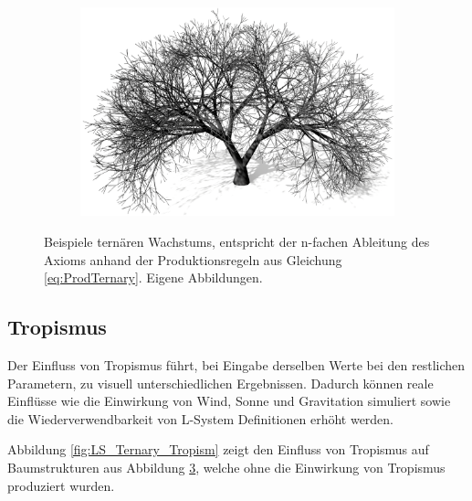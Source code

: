 \begin{figure} [hbtp]
\begin{subfigure}[t]{.45\textwidth}
		\caption{}
		\label{subfig:LS_Ternary_3}
	\end{subfigure}
	\begin{subfigure}[t]{.45\textwidth}
		\centering
		\includegraphics[width=\linewidth]{images/LS_Ternary_4.png}
		\caption{}
		\label{subfig:LS_Ternary_4}
	\end{subfigure}
	\caption{Beispiele ternären Wachstums, entspricht der n-fachen Ableitung des Axioms anhand der Produktionsregeln aus Gleichung \ref{eq:ProdTernary}. Eigene Abbildungen.}
	\label{fig:LS_Ternary}
\end{figure}


\subsection{Tropismus}

Der Einfluss von Tropismus führt, bei Eingabe derselben Werte bei den restlichen Parametern, zu visuell unterschiedlichen Ergebnissen. Dadurch können reale Einflüsse wie die Einwirkung von Wind, Sonne und Gravitation simuliert sowie die Wiederverwendbarkeit von L-System Definitionen erhöht werden. \cite[S.58]{ABOP:04}

Abbildung \ref{fig:LS_Ternary_Tropism} zeigt den Einfluss von Tropismus auf Baumstrukturen aus Abbildung \ref{fig:LS_Ternary}, welche ohne die Einwirkung von Tropismus produziert wurden.


